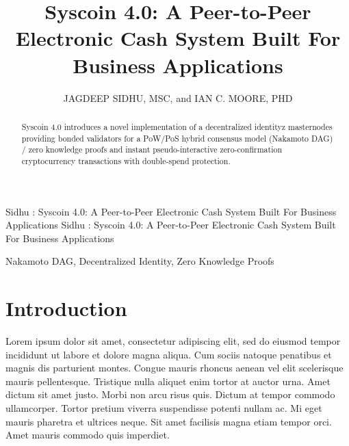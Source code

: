 \documentclass[peerreview]{ieeesyscoin}
\begin{document}
\linenumbers
\history{}

\title{\centering Syscoin 4.0: A Peer-to-Peer Electronic Cash System Built For Business Applications}
\author{\centering  \uppercase{Jagdeep Sidhu, MSc}, 
and \uppercase{Ian C. Moore, PhD}}

\address[1]{\centering Syscoin Core Developer, Blockchain Foundry Inc.(e-mail: jsidhu@blockchainfoundry.co)}
\address[2]{\centering  (e-mail: ic3moore@gmail.com)}
\tfootnote{}

\markboth
{Sidhu \headeretal: Syscoin 4.0: A Peer-to-Peer Electronic Cash System Built For Business Applications}
{Sidhu \headeretal: Syscoin 4.0: A Peer-to-Peer Electronic Cash System Built For Business Applications}

\corresp{}

\begin{abstract}
Syscoin 4.0 introduces a novel implementation of a decentralized identityz masternodes providing bonded validators for a PoW/PoS hybrid consensus model (Nakamoto DAG) / zero knowledge proofs and instant pseudo-interactive zero-confirmation cryptocurrency transactions with double-spend protection.
\end{abstract}

\begin{keywords}
Nakamoto DAG, Decentralized Identity, Zero Knowledge Proofs
\end{keywords}

\titlepgskip=-15pt

\maketitle

\section{Introduction}
\label{sec:introduction}
Lorem ipsum dolor sit amet, consectetur adipiscing elit, sed do eiusmod tempor incididunt ut labore et dolore magna aliqua. Cum sociis natoque penatibus et magnis dis parturient montes. Congue mauris rhoncus aenean vel elit scelerisque mauris pellentesque. Tristique nulla aliquet enim tortor at auctor urna. Amet dictum sit amet justo. Morbi non arcu risus quis. Dictum at tempor commodo ullamcorper. Tortor pretium viverra suspendisse potenti nullam ac. Mi eget mauris pharetra et ultrices neque. Sit amet facilisis magna etiam tempor orci. Amet mauris commodo quis imperdiet.
\end{document}

